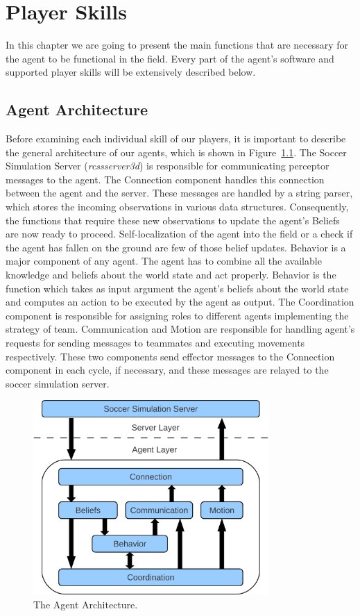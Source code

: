 \chapter{Player Skills}
\label{Agent}

In this chapter we are going to present the main functions that are necessary for the agent to be functional in the field. Every part of the agent's software and supported player skills will be extensively described below. 


\section{Agent Architecture}
\label{Architecture}

Before examining each individual skill of our players, it is important to describe the general architecture of our agents, which is shown in  Figure~\ref{fig:Architecture}. The Soccer Simulation Server (\textit{rcssserver3d}) is responsible for communicating perceptor messages to the agent. The Connection component handles this connection between the agent and the server. These messages are handled by a string parser, which stores the incoming observations in various data structures. Consequently, the functions that require these new observations  to update the agent's Beliefs are now ready to proceed. Self-localization of the agent into the field or a check if the agent has fallen on the ground are few of those belief updates. Behavior is a major component of any agent. The agent has to combine all the available knowledge and beliefs about the world state and act properly. Behavior is the function which takes as input argument the agent's beliefs about the world state and computes an action to be executed by the agent as output. The Coordination component is responsible for assigning roles to different agents implementing the strategy of team. Communication  and Motion are responsible for handling agent's requests for sending messages to teammates and executing movements respectively. These two components send effector messages to the Connection component in each cycle, if necessary, and these messages are relayed to the soccer simulation server.

\begin{figure}[t!]
\centering
  \includegraphics[width=0.8\textwidth]{Chapter3/figures/Arch.pdf}
  \caption{The Agent Architecture.}
  \label{fig:Architecture}
\end{figure}


